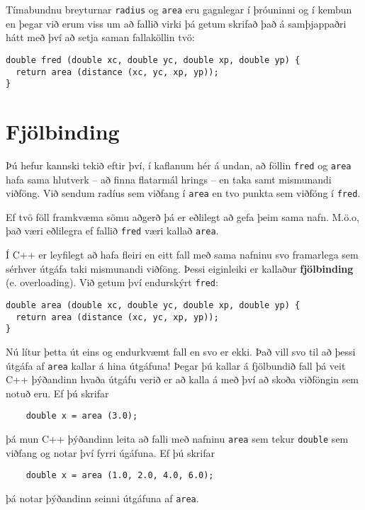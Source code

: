 Tímabundnu breyturnar {\tt radius} og {\tt area} eru gagnlegar í þróuninni og í kembun 
en þegar við erum viss um að fallið virki þá getum skrifað það á samþjappaðri hátt með því að setja saman fallaköllin tvö:

\begin{verbatim}
double fred (double xc, double yc, double xp, double yp) {
  return area (distance (xc, yc, xp, yp));
} 
\end{verbatim}

\section{Fjölbinding}
\label{overloading}

Þú hefur kannski tekið eftir því, í kaflanum hér á undan, að föllin
{\tt fred} og {\tt area} hafa sama hlutverk -- að finna flatarmál hrings -- en taka samt mismunandi viðföng. 
Við sendum radíus sem viðfang í {\tt area} en tvo punkta sem viðföng í {\tt fred}.

Ef tvö föll framkvæma sömu aðgerð þá er eðlilegt að gefa þeim sama nafn.
M.ö.o, það væri eðlilegra ef fallið {\tt fred} væri kallað {\tt area}.

Í C++ er leyfilegt að hafa fleiri en eitt fall með sama nafninu svo framarlega sem sérhver útgáfa taki mismunandi viðföng.
Þessi eiginleiki er kallaður {\bf fjölbinding} (e. overloading).
Við getum því endurskýrt {\tt fred}:

\begin{verbatim}
double area (double xc, double yc, double xp, double yp) {
  return area (distance (xc, yc, xp, yp));
} 
\end{verbatim}
%
Nú lítur þetta út eins og endurkvæmt fall en svo er ekki.
Það vill svo til að þessi útgáfa af {\tt area} kallar á hina útgáfuna!
Þegar þú kallar á fjölbundið fall þá veit C++ þýðandinn hvaða útgáfu verið er að kalla á með því að skoða viðföngin sem notuð eru.
Ef þú skrifar

\begin{verbatim}
    double x = area (3.0);
\end{verbatim}
%
þá mun C++ þýðandinn leita að falli með nafninu {\tt area} sem tekur {\tt double} sem viðfang og notar því fyrri úgáfuna.
Ef þú skrifar

\begin{verbatim}
    double x = area (1.0, 2.0, 4.0, 6.0);
\end{verbatim}
%
þá notar þýðandinn seinni útgáfuna af {\tt area}.  


